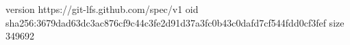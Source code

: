 version https://git-lfs.github.com/spec/v1
oid sha256:3679dad63dc3ac876cf9c44c3fe2d91d37a3fc0b43c0dafd7cf544fdd0cf3fef
size 349692
